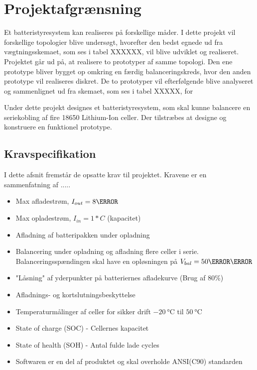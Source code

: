 \section{Projektafgrænsning}
Et batteristyresystem kan realiseres på forskellige måder. I dette projekt vil forskellige topologier blive undersøgt, hvorefter den bedst egnede ud fra vægtningsskemaet, som ses i tabel XXXXXX, vil blive udviklet og realiseret. \\

Projektet går ud på, at realisere to prototyper af samme topologi. Den ene prototype bliver bygget op omkring en færdig balanceringskreds, hvor den anden prototype vil realiseres diskret. De to prototyper vil efterfølgende blive analyseret og sammenlignet ud fra skemaet, som ses i tabel XXXXX, for 


Under dette projekt designes et batteristyresystem, som skal kunne balancere en seriekobling af fire 18650 Lithium-Ion celler. Der tilstræbes at designe og konstruere en funktionel prototype.

\subsection{Kravspecifikation} \label{afs:kravspecifikation}
I dette afsnit fremstår de opsatte krav til projektet. Kravene er en sammenfatning af ..... \\

\begin{itemize}[noitemsep]
	\item Max afladestrøm, $I_{out} = 8\ampere$
	\item Max opladestrøm, $I_{in} = 1*C$ (kapacitet)
	\item Afladning af batteripakken under opladning
	\item Balancering under opladning og afladning flere celler i serie. Balanceringsspændingen skal have en opløsningen på  $V_{bal} = 50\milli\volt$
	\item "Låsning" af yderpunkter på batteriernes afladekurve (Brug af 80\%)
	\item Afladnings- og kortslutningsbeskyttelse
	\item Temperaturmålinger af celler for sikker drift $\SI{-20}{\celsius}$ til $\SI{50}{\celsius}$
	\item State of charge (SOC) - Cellernes kapacitet
	\item State of health (SOH) - Antal fulde lade cycles
	\item Softwaren er en del af produktet og skal overholde ANSI(C90) standarden
\end{itemize}

